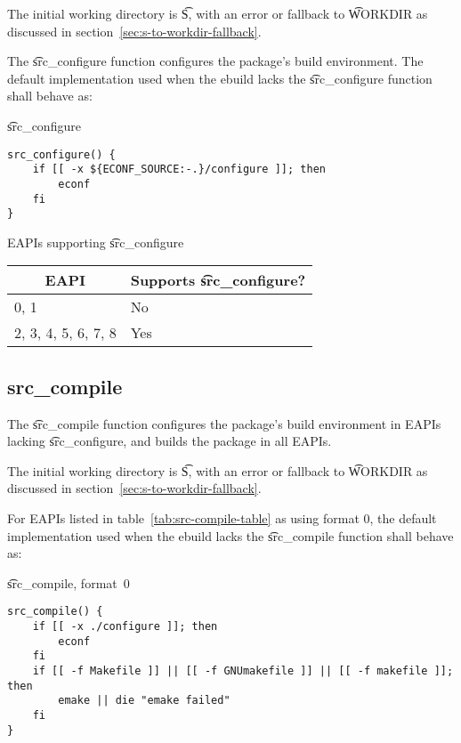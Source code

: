 The initial working directory is \t{S}, with an error or fallback to \t{WORKDIR} as discussed in
section~\ref{sec:s-to-workdir-fallback}.

The \t{src_configure} function configures the package's build environment. The default
implementation used when the ebuild lacks the \t{src_configure} function shall behave as:

\begin{listing}[H]
\caption{\t{src_configure}}
\begin{verbatim}
src_configure() {
    if [[ -x ${ECONF_SOURCE:-.}/configure ]]; then
        econf
    fi
}
\end{verbatim}
\end{listing}

\begin{centertable}{EAPIs supporting \t{src_configure}}
    \label{tab:src-configure-table}
    \begin{tabular}{ll}
      \toprule
      \multicolumn{1}{c}{\textbf{EAPI}} &
      \multicolumn{1}{c}{\textbf{Supports \t{src_configure}?}} \\
      \midrule
      0, 1                & No  \\
      2, 3, 4, 5, 6, 7, 8 & Yes \\
      \bottomrule
    \end{tabular}
\end{centertable}

\subsection{src_compile}

 The \t{src_compile} function configures the package's build environment
in EAPIs lacking \t{src_configure}, and builds the package in all EAPIs.

The initial working directory is \t{S}, with an error or fallback to \t{WORKDIR} as discussed in
section~\ref{sec:s-to-workdir-fallback}.

 For EAPIs listed in table~\ref{tab:src-compile-table} as using format
0, the default implementation used when the ebuild lacks the \t{src_compile} function shall behave
as:

\begin{listing}[H]
\caption{\t{src_compile}, format~0}
\begin{verbatim}
src_compile() {
    if [[ -x ./configure ]]; then
        econf
    fi
    if [[ -f Makefile ]] || [[ -f GNUmakefile ]] || [[ -f makefile ]]; then
        emake || die "emake failed"
    fi
}
\end{verbatim}
\end{listing}


